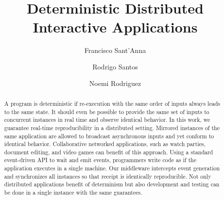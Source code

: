 \documentclass[sigplan,screen]{acmart}
\begin{document}
\title{Deterministic Distributed Interactive Applications}

\author{Francisco Sant'Anna}

\author{Rodrigo Santos}

\author{Noemi Rodriguez}


\begin{abstract}
A program is deterministic if re-execution with the same order of inputs always
leads to the same state.
It should even be possible to provide the same set of inputs to concurrent
instances in real time and observe identical behavior.
%
In this work, we guarantee real-time reproducibility in a distributed setting.
Mirrored instances of the same application are allowed to broadcast
asynchronous inputs and yet conform to identical behavior.
Collaborative networked applications, such as watch parties, document editing,
and video games can benefit of this approach.
%
Using a standard event-driven API to wait and emit events, programmers write
code as if the application executes in a single machine.
Our middleware intercepts event generation and synchronizes all instances so
that receipt is identically reproducible.
Not only distributed applications benefit of determinism but also development
and testing can be done in a single instance with the same guarantees.
\end{abstract}

\maketitle
\end{document}
